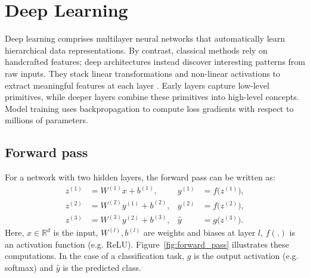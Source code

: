 



\section{Deep Learning} 
\label{sec:deep_learning}

Deep learning comprises multilayer neural networks that automatically learn hierarchical data representations. By contrast, classical methods rely on handcrafted features; deep architectures instead discover interesting patterns from raw inputs. They stack linear transformations and non-linear activations to extract meaningful features at each layer \cite{lecun_deep_learning_2015}. 
Early layers capture low-level primitives, while deeper layers combine these primitives into high-level concepts. Model training uses backpropagation to compute loss gradients with respect to millions of parameters. 

\subsection{Forward pass}
For a network with two hidden layers, the forward pass can be written as:
\begin{align}
z^{(1)} &= W^{(1)} x + b^{(1)}, & y^{(1)} &= f\bigl(z^{(1)}\bigr), \\
z^{(2)} &= W^{(2)} y^{(1)} + b^{(2)}, & y^{(2)} &= f\bigl(z^{(2)}\bigr), \\
z^{(3)} &= W^{(3)} y^{(2)} + b^{(3)}, & \hat{y} &= g\bigl(z^{(3)}\bigr).
\end{align}
Here, \(x\in\mathbb{R}^d\) is the input, \(W^{(l)},b^{(l)}\) are weights and biases at layer \(l\), \(f(.)\) is an activation function (e.g. ReLU). Figure~\ref{fig:forward_pass} illustrates these computations. In the case of a classification task, \(g\) is the output activation (e.g. softmax) and \(\hat{y}\) is the predicted class.

